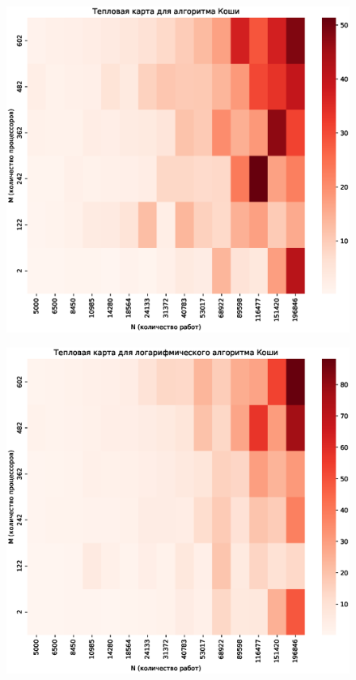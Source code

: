 \documentclass[openany, twoside, a4paper, 12pt]{extbook}
\begin{document}
	\begin{figure}[H]
	    \centering
	    \includegraphics[width=\textwidth]{cauchy_heatmap.eps}
	    \label{fig:cauchy}
	\end{figure}
	
	\begin{figure}[H]
	    \centering
	    \includegraphics[width=\textwidth]{log_cauchy_heatmap.eps}
	    \label{fig:log_cauchy}
	\end{figure}
\end{document}
